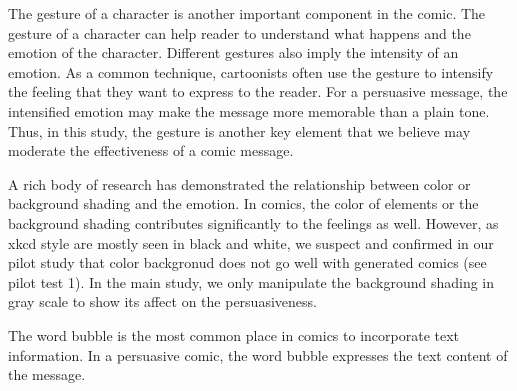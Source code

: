 The gesture of a character is another important component in the comic. The gesture of a character can help reader to understand what happens and the emotion of the character. Different gestures also imply the intensity of an emotion. As a common technique, cartoonists often use the gesture to intensify the feeling that they want to express to the reader. For a persuasive message, the intensified emotion may make the message more memorable than a plain tone. Thus, in this study, the gesture is another key element that we believe may moderate the effectiveness of a comic message.\par
A rich body of research has demonstrated the relationship between color or background shading and the emotion. In comics, the color of elements or the background shading contributes significantly to the feelings as well. However, as xkcd style are mostly seen in black and white, we suspect and confirmed in our pilot study that color backgronud does not go well with generated comics (see pilot test 1). In the main study, we only manipulate the background shading in gray scale to show its affect on the persuasiveness. \par
The word bubble is the most common place in comics to incorporate text information. In a persuasive comic, the word bubble expresses the text content of the message.  \par

